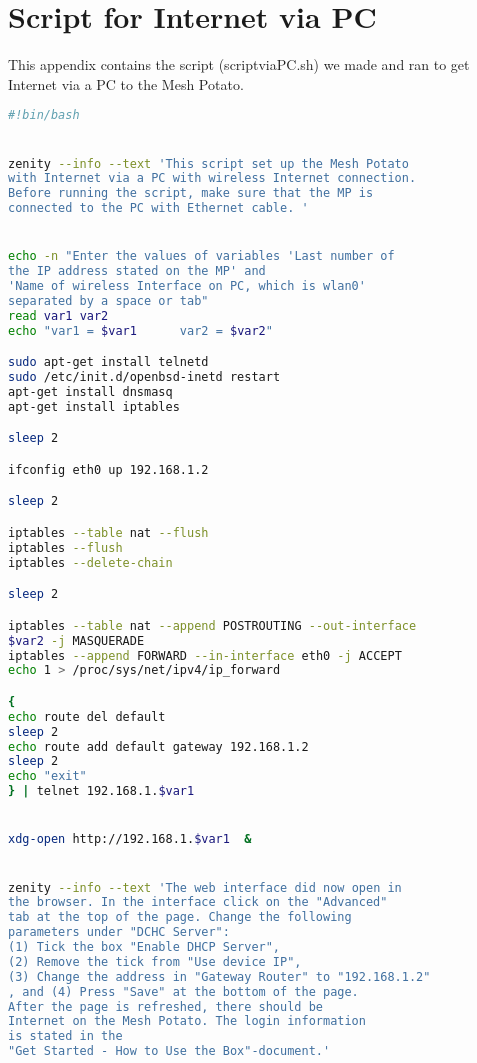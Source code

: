 \chapter{Script for Internet via PC}
\label{chp:appendixD} 

This appendix contains the script (scriptviaPC.sh) we made and ran to get Internet via a PC to the Mesh Potato.  

\begin{framed}
\noindent
\lstset{showstringspaces=false}
\begin{lstlisting}[language=sh]
#!bin/bash


zenity --info --text 'This script set up the Mesh Potato 
with Internet via a PC with wireless Internet connection. 
Before running the script, make sure that the MP is
connected to the PC with Ethernet cable. '


echo -n "Enter the values of variables 'Last number of 
the IP address stated on the MP' and 
'Name of wireless Interface on PC, which is wlan0'
separated by a space or tab"
read var1 var2
echo "var1 = $var1      var2 = $var2"

sudo apt-get install telnetd
sudo /etc/init.d/openbsd-inetd restart
apt-get install dnsmasq
apt-get install iptables 

sleep 2

ifconfig eth0 up 192.168.1.2

sleep 2

iptables --table nat --flush
iptables --flush
iptables --delete-chain

sleep 2

iptables --table nat --append POSTROUTING --out-interface
$var2 -j MASQUERADE
iptables --append FORWARD --in-interface eth0 -j ACCEPT
echo 1 > /proc/sys/net/ipv4/ip_forward

{
echo route del default
sleep 2
echo route add default gateway 192.168.1.2 
sleep 2
echo "exit"
} | telnet 192.168.1.$var1 


xdg-open http://192.168.1.$var1  &


zenity --info --text 'The web interface did now open in 
the browser. In the interface click on the "Advanced" 
tab at the top of the page. Change the following 
parameters under "DCHC Server": 
(1) Tick the box "Enable DHCP Server", 
(2) Remove the tick from "Use device IP", 
(3) Change the address in "Gateway Router" to "192.168.1.2"
, and (4) Press "Save" at the bottom of the page. 
After the page is refreshed, there should be 
Internet on the Mesh Potato. The login information 
is stated in the 
"Get Started - How to Use the Box"-document.'

\end{lstlisting}
\end{framed}

